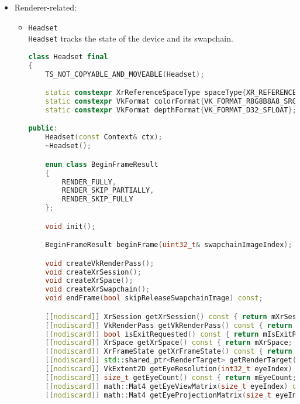 \begin{itemize}
\begin{itemize}
\begin{lstlisting}[language=c++, caption=\texttt{RendererProcess} class (./engine/src/core/renderer\_process.h)]
private:
    const Context& mCtx;
    VkCommandBuffer mCommandBuffer{};
    VkSemaphore mDrawableSemaphore{}, mPresentableSemaphore{};
    VkFence mFence{};
    std::unique_ptr<DataBuffer> mUniformBuffer;
    void* mUniformBufferMemory{};
    VkDescriptorSet mDescriptorSet{};
    const Headset& mHeadset;
};
\end{lstlisting}
    \end{itemize}
    \item Renderer-related:
    \begin{itemize}
        \item \texttt{Headset}\\
        \label{sec:headset}
        \texttt{Headset} tracks the state of the device and its swapchain.
\begin{lstlisting}[language=c++, caption=\texttt{Headset} class (./engine/src/core/headset.h)]
class Headset final
{
    TS_NOT_COPYABLE_AND_MOVEABLE(Headset);

    static constexpr XrReferenceSpaceType spaceType{XR_REFERENCE_SPACE_TYPE_STAGE};
    static constexpr VkFormat colorFormat{VK_FORMAT_R8G8B8A8_SRGB};
    static constexpr VkFormat depthFormat{VK_FORMAT_D32_SFLOAT};

public:
    Headset(const Context& ctx);
    ~Headset();

    enum class BeginFrameResult
    {
        RENDER_FULLY,
        RENDER_SKIP_PARTIALLY,
        RENDER_SKIP_FULLY
    };

    void init();

    BeginFrameResult beginFrame(uint32_t& swapchainImageIndex);

    void createVkRenderPass();
    void createXrSession();
    void createXrSpace();
    void createXrSwapchain();
    void endFrame(bool skipReleaseSwapchainImage) const;

    [[nodiscard]] XrSession getXrSession() const { return mXrSession; }
    [[nodiscard]] VkRenderPass getVkRenderPass() const { return mVkRenderPass; }
    [[nodiscard]] bool isExitRequested() const { return mIsExitRequested; }
    [[nodiscard]] XrSpace getXrSpace() const { return mXrSpace; }
    [[nodiscard]] XrFrameState getXrFrameState() const { return mXrFrameState; }
    [[nodiscard]] std::shared_ptr<RenderTarget> getRenderTarget(size_t swapchainImageIndex) const { return mSwapchainRenderTargets.at(swapchainImageIndex); }
    [[nodiscard]] VkExtent2D getEyeResolution(int32_t eyeIndex) const;
    [[nodiscard]] size_t getEyeCount() const { return mEyeCount; }
    [[nodiscard]] math::Mat4 getEyeViewMatrix(size_t eyeIndex) const { return mEyeviewMats.at(eyeIndex); }
    [[nodiscard]] math::Mat4 getEyeProjectionMatrix(size_t eyeIndex) const { return mEyeProjectionMatrices.at(eyeIndex); }


\end{lstlisting}
\end{itemize}
\end{itemize}
